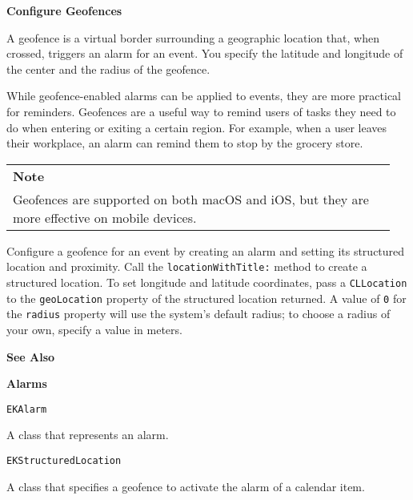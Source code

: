 \documentclass{article}
\begin{document}
\noindent \textbf{Configure Geofences}

\noindent A geofence is a virtual border surrounding a geographic location that, when crossed, triggers an alarm for an event. You specify the latitude and longitude of the center and the radius of the geofence.

\noindent While geofence-enabled alarms can be applied to events, they are more practical for reminders. Geofences are a useful way to remind users of tasks they need to do when entering or exiting a certain region. For example, when a user leaves their workplace, an alarm can remind them to stop by the grocery store.

\noindent
\begin{tabular}{|p{0.95\linewidth}|} \hline
\textbf{Note}\\
Geofences are supported on both macOS and iOS, but they are more effective on mobile devices. \\ \hline
\end{tabular}

\noindent Configure a geofence for an event by creating an alarm and setting its structured location and proximity. Call the \texttt{locationWithTitle:} method to create a structured location. To set longitude and latitude coordinates, pass a \texttt{CLLocation} to the \texttt{geoLocation} property of the structured location returned. A value of \texttt{0} for the \texttt{radius} property will use the system's default radius; to choose a radius of your own, specify a value in meters.

\noindent \textbf{See Also}

\noindent \textbf{Alarms}

\noindent \texttt{EKAlarm}

\noindent A class that represents an alarm.

\noindent \texttt{EKStructuredLocation}

\noindent A class that specifies a geofence to activate the alarm of a calendar item.
\newpage
\end{document}
